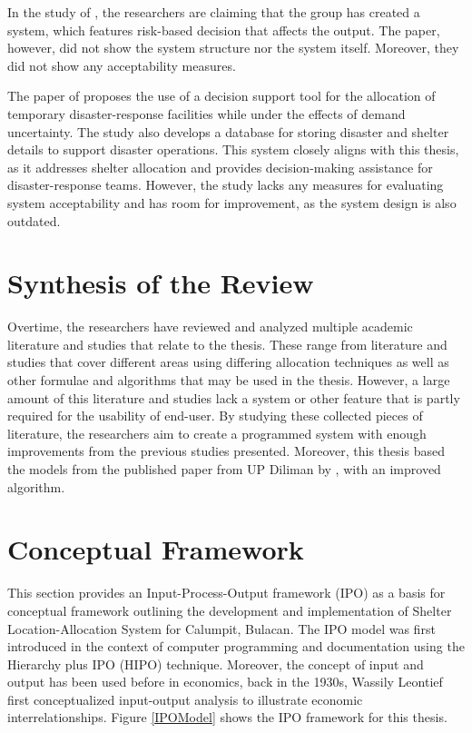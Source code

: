 	In the study of \textcite{Amir2023}, the researchers are claiming that the group has created a system, which features risk-based decision that affects the output. The paper, however, did not show the system structure nor the system itself. Moreover, they did not show any acceptability measures.
	
	 The paper of \textcite{Cavdur2019} proposes the use of a decision support tool for the allocation of temporary disaster-response facilities while under the effects of demand uncertainty. The study also develops a database for storing disaster and shelter details to support disaster operations. This system closely aligns with this thesis, as it addresses shelter allocation and provides decision-making assistance for disaster-response teams. However, the study lacks any measures for evaluating system acceptability and has room for improvement, as the system design is also outdated.

\section{Synthesis of the Review}
	Overtime, the researchers have reviewed and analyzed multiple academic literature and studies that relate to the thesis. These range from literature and studies that cover different areas using differing allocation techniques as well as other formulae and algorithms that may be used in the thesis. However, a large amount of this literature and studies lack a system or other feature that is partly required for the usability of end-user. By studying these collected pieces of literature, the researchers aim to create a programmed system with enough improvements from the previous studies presented. Moreover, this thesis based the models from the published paper from UP Diliman by \textcite{LeahUP}, with an improved algorithm.

\section{Conceptual Framework}
	This section provides an Input-Process-Output framework (IPO) as a basis for conceptual framework outlining the development and implementation of Shelter Location-Allocation System for Calumpit, Bulacan. The IPO model was first introduced in the context of computer programming and documentation using the Hierarchy plus IPO (HIPO) technique. Moreover, the concept of input and output has been used before in economics, back in the 1930s, Wassily Leontief first conceptualized input-output analysis to illustrate economic interrelationships. Figure \ref{IPOModel} shows the IPO framework for this thesis.
	
